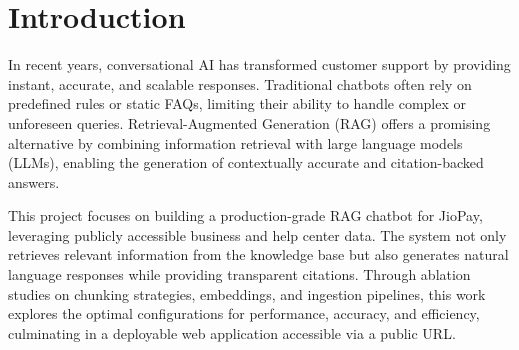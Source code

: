 \section{Introduction}
In recent years, conversational AI has transformed customer support by providing instant, accurate, and scalable responses. Traditional chatbots often rely on predefined rules or static FAQs, limiting their ability to handle complex or unforeseen queries. Retrieval-Augmented Generation (RAG) offers a promising alternative by combining information retrieval with large language models (LLMs), enabling the generation of contextually accurate and citation-backed answers.

This project focuses on building a production-grade RAG chatbot for JioPay, leveraging publicly accessible business and help center data. The system not only retrieves relevant information from the knowledge base but also generates natural language responses while providing transparent citations. Through ablation studies on chunking strategies, embeddings, and ingestion pipelines, this work explores the optimal configurations for performance, accuracy, and efficiency, culminating in a deployable web application accessible via a public URL.